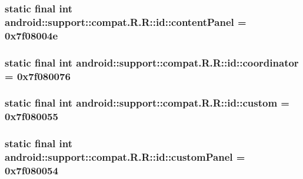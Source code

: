 \hypertarget{classandroid_1_1support_1_1compat_1_1_r_1_1id_bc4396c5d67a897366f1effc46fd8ee4}{
\subsubsection[{contentPanel}]{\setlength{\rightskip}{0pt plus 5cm}static final int android::support::compat.R.R::id::contentPanel = 0x7f08004e}}
\label{classandroid_1_1support_1_1compat_1_1_r_1_1id_bc4396c5d67a897366f1effc46fd8ee4}


\hypertarget{classandroid_1_1support_1_1compat_1_1_r_1_1id_fef204156567dfd1c2412a8e37e1847f}{
\subsubsection[{coordinator}]{\setlength{\rightskip}{0pt plus 5cm}static final int android::support::compat.R.R::id::coordinator = 0x7f080076}}
\label{classandroid_1_1support_1_1compat_1_1_r_1_1id_fef204156567dfd1c2412a8e37e1847f}


\hypertarget{classandroid_1_1support_1_1compat_1_1_r_1_1id_a8320cc8ac5aa95426d6bd4bb1c198a8}{
\subsubsection[{custom}]{\setlength{\rightskip}{0pt plus 5cm}static final int android::support::compat.R.R::id::custom = 0x7f080055}}
\label{classandroid_1_1support_1_1compat_1_1_r_1_1id_a8320cc8ac5aa95426d6bd4bb1c198a8}


\hypertarget{classandroid_1_1support_1_1compat_1_1_r_1_1id_b9c467a34ff3c1c924acaea4b2b90eaa}{
\subsubsection[{customPanel}]{\setlength{\rightskip}{0pt plus 5cm}static final int android::support::compat.R.R::id::customPanel = 0x7f080054}}
\label{classandroid_1_1support_1_1compat_1_1_r_1_1id_b9c467a34ff3c1c924acaea4b2b90eaa}


